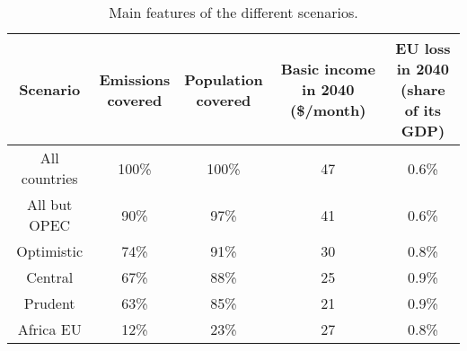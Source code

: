 \begin{table}[h]

\caption{\label{tab:scenarios_table.tex}Main features of the different scenarios.}
\centering
\begin{tabular}[t]{ccccc}
\toprule
Scenario & \makecell{Emissions\\covered} & \makecell{Population\\covered} & \makecell{Basic income\\in 2040 (\$/month)} & \makecell{EU loss in 2040\\(share of its GDP)}\\
\midrule
All countries & 100\% & 100\% & 47 & 0.6\%\\
All but OPEC & 90\% & 97\% & 41 & 0.6\%\\
Optimistic & 74\% & 91\% & 30 & 0.8\%\\
Central & 67\% & 88\% & 25 & 0.9\%\\
Prudent & 63\% & 85\% & 21 & 0.9\%\\
Africa EU & 12\% & 23\% & 27 & 0.8\%\\
\bottomrule
\end{tabular}
\end{table}